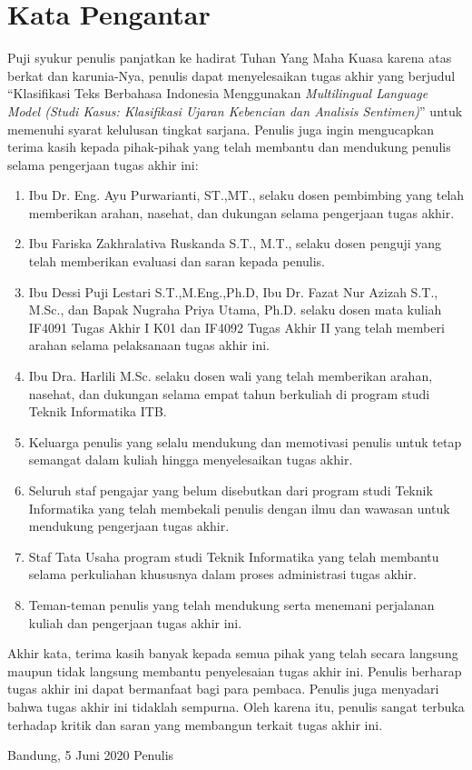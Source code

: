 \chapter*{Kata Pengantar}

Puji syukur penulis panjatkan ke hadirat Tuhan Yang Maha Kuasa karena atas berkat dan karunia-Nya, penulis dapat menyelesaikan tugas akhir yang berjudul “Klasifikasi Teks Berbahasa Indonesia Menggunakan \textit{Multilingual Language Model (Studi Kasus: Klasifikasi Ujaran Kebencian dan Analisis Sentimen)}” untuk memenuhi syarat kelulusan tingkat sarjana. Penulis juga ingin mengucapkan terima kasih kepada pihak-pihak yang telah membantu dan mendukung penulis selama pengerjaan tugas akhir ini:

\begin{enumerate}
    \item Ibu Dr. Eng. Ayu Purwarianti, ST.,MT., selaku dosen pembimbing yang telah memberikan arahan, nasehat, dan dukungan selama pengerjaan tugas akhir.
    \item Ibu Fariska Zakhralativa Ruskanda S.T., M.T., selaku dosen penguji yang telah memberikan evaluasi dan saran kepada penulis.
    \item Ibu Dessi Puji Lestari S.T.,M.Eng.,Ph.D, Ibu Dr. Fazat Nur Azizah S.T., M.Sc., dan Bapak Nugraha Priya Utama, Ph.D. selaku dosen mata kuliah IF4091 Tugas Akhir I K01 dan IF4092 Tugas Akhir II yang telah memberi arahan selama pelaksanaan tugas akhir ini.
    \item Ibu Dra. Harlili M.Sc. selaku dosen wali yang telah memberikan arahan, nasehat, dan dukungan selama empat tahun berkuliah di program studi Teknik Informatika ITB.
    \item Keluarga penulis yang selalu mendukung dan memotivasi penulis untuk tetap semangat dalam kuliah hingga menyelesaikan tugas akhir.
    \item Seluruh staf pengajar yang belum disebutkan dari program studi Teknik Informatika yang telah membekali penulis dengan ilmu dan wawasan untuk mendukung pengerjaan tugas akhir.
    \item Staf Tata Usaha program studi Teknik Informatika yang telah membantu selama perkuliahan khususnya dalam proses administrasi tugas akhir.
    \item Teman-teman penulis yang telah mendukung serta menemani perjalanan kuliah dan pengerjaan tugas akhir ini.

    
\end{enumerate}
Akhir kata, terima kasih banyak kepada semua pihak yang telah secara langsung maupun tidak langsung membantu penyelesaian tugas akhir ini. Penulis berharap tugas akhir ini dapat bermanfaat bagi para pembaca. Penulis juga menyadari bahwa tugas akhir ini tidaklah sempurna. Oleh karena itu, penulis sangat terbuka terhadap kritik dan saran yang membangun terkait tugas akhir ini.

\begin{flushright} 
    Bandung, 5 Juni 2020
    \linebreak[3]
    Penulis
\end{flushright}
\clearpage
